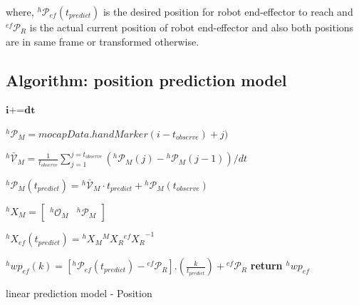 where, ${}^{h}\mathcal{P}_{ef}(t_{predict})$ is the desired position for robot end-effector to reach and ${}^{ef}\mathcal{P}_{R}$ is the actual current position of robot end-effector and also both positions are in same frame or transformed otherwise.

\subsection{Algorithm: position prediction model}

\begin{algorithm}[H] \label{positionalgo}
	\DontPrintSemicolon
	\SetNoFillComment
	
	
	
	\textit{$\textbf{i+=dt}$} 
	
	{
		{
			${}^{h}\mathcal{P}_M= \textit{mocapData}.handMarker(i-t_{observe})+j)$	
		}
		
		${}^{h}\mathcal{\bar{V}}_{M} = \frac{1}{t_{observe}}{\sum_{j=1}^{j=t_{observe}} ({}^{h}\mathcal{P}_{M}(j)-{}^{h}\mathcal{P}_{M}(j-1))/dt }$\newline 
		
		${}^{h}\mathcal{P}_M(t_{predict}) = {}^{h}\mathcal{\bar{V}}_{M} \cdot t_{predict}  + {}^{h}\mathcal{P}_{M}(t_{observe})$ %
		
		
		${}^{h}{X}_M= \begin{bmatrix} {}^{h}\mathcal{O}_{M} &  {}^{h}\mathcal{P}_M	\end{bmatrix}$ \newline
		
		${}^{h}{X}_{ef}(t_{predict}) =  {}^{h}{X}_M  {}^{M}{X}_R {{}^{ef}{X}_R}^{-1}$ \newline
		
		
		{
			{
				${}^{h}wp_{ef}(k) = [{}^{h}\mathcal{P}_{ef}(t_{predict}) - {}^{ef}\mathcal{P}_{R}] . (\frac{k}{t_{predict}})  + {}^{ef}\mathcal{P}_{R} $ 
			}	
			\textbf{return} $ {}^{h}wp_{ef} $
		}
	}
	\caption{linear prediction model - Position}
\end{algorithm}

